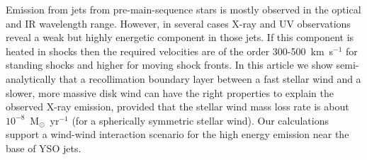 Emission from jets from pre-main-sequence stars is mostly observed in the optical and IR wavelength range. However, in several cases X-ray and UV observations reveal a weak but highly energetic component in those jets. If this component is heated in shocks then the required velocities are of the order 300-500~km~s$^{-1}$ for standing shocks and higher for moving shock fronts. In this article we show semi-analytically that a recollimation boundary layer between a fast stellar wind and a slower, more massive disk wind can have the right properties to explain the observed X-ray emission, provided that the stellar wind mass loss rate is about $10^{-8}$~M$_{\odot}$~yr$^{-1}$ (for a spherically symmetric stellar wind). Our calculations support a wind-wind interaction scenario for the high energy emission near the base of YSO jets. 
